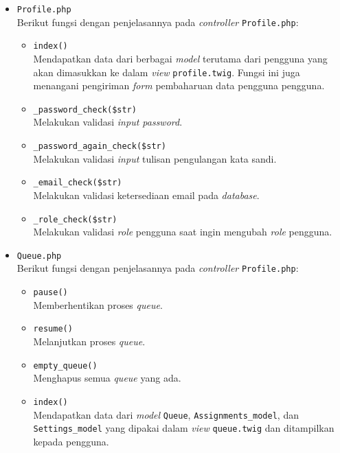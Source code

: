 \begin{itemize}
\begin{itemize}
	\item \verb|Profile.php| \\
	      Berikut fungsi dengan penjelasannya pada \textit{controller} \verb|Profile.php|:

	      \begin{itemize}
		      \item \verb|index()| \\
		            Mendapatkan data dari berbagai \textit{model} terutama dari pengguna yang akan dimasukkan ke dalam \textit{view} \verb|profile.twig|. Fungsi ini juga menangani pengiriman \textit{form} pembaharuan data pengguna pengguna. 
		      \item \verb|_password_check($str)| \\
		            Melakukan validasi \textit{input password}.
		      \item \verb|_password_again_check($str)| \\
		            Melakukan validasi \textit{input} tulisan pengulangan kata sandi.
		      \item \verb|_email_check($str)| \\
		            Melakukan validasi ketersediaan email pada \textit{database}.
		      \item \verb|_role_check($str)| \\
		            Melakukan validasi \textit{role} pengguna saat ingin mengubah \textit{role} pengguna.

	      \end{itemize}

	\item \verb|Queue.php| \\
	      Berikut fungsi dengan penjelasannya pada \textit{controller} \verb|Profile.php|:

	      \begin{itemize}
		      \item \verb|pause()| \\
		            Memberhentikan proses \textit{queue}.
		      \item \verb|resume()| \\
		            Melanjutkan proses \textit{queue}.
		      \item \verb|empty_queue()| \\
		            Menghapus semua \textit{queue} yang ada.
		      \item \verb|index()| \\
		            Mendapatkan data dari \textit{model} \verb|Queue|, \verb|Assignments_model|, dan \verb|Settings_model| yang dipakai dalam \textit{view} \verb|queue.twig| dan ditampilkan kepada pengguna. 
	      \end{itemize}


\end{itemize}
\end{itemize}
